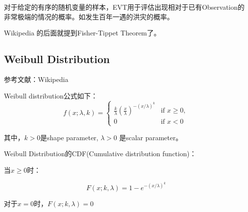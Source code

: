 对于给定的有序的随机变量的样本，EVT用于评估出现相对于已有Observation的非常极端的情况的概率。如发生百年一遇的洪灾的概率。

Wikipedia 的后面就提到Fisher-Tippet Theorem了。

\subsection{Weibull Distribution}

参考文献：Wikipedia


Weibull distribution公式如下：
\begin{displaymath}
f(x; \lambda, k) = \begin{cases}
\frac{k}{\lambda} (\frac{x}{\lambda})^{-(x/\lambda)^k} & \text{if } x \ge 0, \\
0 & \text{if } x < 0
\end{cases}
\end{displaymath}

其中，$k>0$是shape parameter, $\lambda > 0$  是scalar parameter。

Weibull Distribution的CDF(Cumulative distribution function)：

当$x \ge 0$时：

\begin{displaymath}
F(x; k, \lambda) = 1 - e^{-(x/\lambda)^k}
\end{displaymath}

对于$x = 0$时，$F(x; k, \lambda) = 0$










